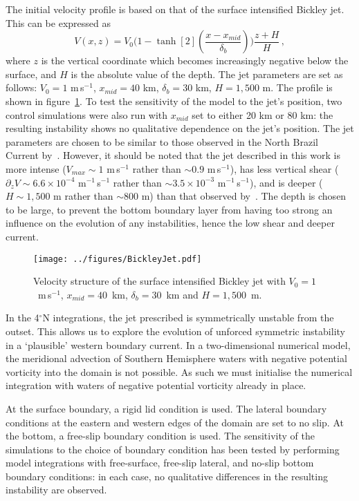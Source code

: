 The initial velocity profile is based on that of the surface intensified Bickley jet. This can be expressed as
\begin{equation}
    V(x, z) = V_0 \Bigg( 1 - \tanh[2](\frac{x - x_{mid}}{\delta_b})\Bigg) \frac{z + H}{H} \, ,
\end{equation}
where $z$ is the vertical coordinate which becomes increasingly negative below the surface, and $H$ is the absolute value of the depth. The jet parameters are set as follows: $V_0 = 1$ m\,s$^{-1}$, $x_{mid} = 40$ km, $\delta_b = 30$ km, $H = 1,500$ m. The profile is shown in figure~\ref{fig:SurfIntBickleyJet}. To test the sensitivity of the model to the jet's position, two control simulations were also run with $x_{mid}$ set to either 20 km or 80 km: the resulting instability shows no qualitative dependence on the jet's position. The jet parameters are chosen to be similar to those observed in the North Brazil Current by~\citet{Johns1998}. However, it should be noted that the jet described in this work is more intense ($V_{max} \sim 1$ m\,s$^{-1}$ rather than $\sim 0.9$ m\,s$^{-1}$), has less vertical shear ($\partial_z V \sim 6.6\times 10^{-4}$ m$^{-1}$\,s$^{-1}$ rather than $\sim 3.5 \times 10^{-3}$ m$^{-1}$\,s$^{-1}$), and is deeper ($H\sim 1,500$ m rather than $\sim 800$ m) than that observed by~\citet{Johns1998}. The depth is chosen to be large, to prevent the bottom boundary layer from having too strong an influence on the evolution of any instabilities, hence the low shear and deeper current.

\begin{figure} 
    \centering
    \texttt{[image: ../figures/BickleyJet.pdf]}
    \caption{Velocity structure of the surface intensified Bickley jet with $V_0 = 1$~m$\,$s$^{-1}$, $x_{mid} = 40$~km, $\delta_b = 30$~km and $H = 1,500$~m.}
    \label{fig:SurfIntBickleyJet}
\end{figure}

In the 4$^\circ$N integrations, the jet prescribed is symmetrically unstable from the outset. This allows us to explore the evolution of unforced symmetric instability in a `plausible' western boundary current. In a two-dimensional numerical model, the meridional advection of Southern Hemisphere waters with negative potential vorticity into the domain is not possible. As such we must initialise the numerical integration with waters of negative potential vorticity already in place.

At the surface boundary, a rigid lid condition is used. The lateral boundary conditions at the eastern and western edges of the domain are set to no slip. At the bottom, a free-slip boundary condition is used. The sensitivity of the simulations to the choice of boundary condition has been tested by performing model integrations with free-surface, free-slip lateral, and no-slip bottom boundary conditions: in each case, no qualitative differences in the resulting instability are observed.

